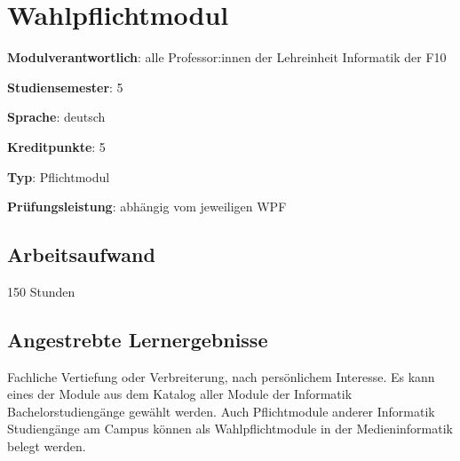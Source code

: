 \hypertarget{wahlpflichtmodulpathlabelmi-2017modulbeschreibungen-bachelorba_wpf}{%
\chapter{Wahlpflichtmodul\label{/mi-2017/modulbeschreibungen-bachelor/BA_WPF}}\label{wahlpflichtmodulpathlabelmi-2017modulbeschreibungen-bachelorba_wpf}}

\begin{modulHead}
\textbf{Modulverantwortlich}: alle Professor:innen
der Lehreinheit Informatik der
F10
\end{modulHead}
\begin{modulHead}
\textbf{Studiensemester}:
5
\end{modulHead}
\begin{modulHead}
\textbf{Sprache}:
deutsch
\end{modulHead}
\begin{modulHead}
\textbf{Kreditpunkte}:
5
\end{modulHead}
\begin{modulHead}
\textbf{Typ}:
Pflichtmodul
\end{modulHead}
\begin{modulHead}
\textbf{Prüfungsleistung}:
abhängig vom jeweiligen WPF
\end{modulHead}


\hypertarget{arbeitsaufwandpathlabelmi-2017modulbeschreibungen-bachelorba_wpf}{%
\section*{Arbeitsaufwand\label{/mi-2017/modulbeschreibungen-bachelor/BA_WPF}}\label{arbeitsaufwandpathlabelmi-2017modulbeschreibungen-bachelorba_wpf}}

150 Stunden

\hypertarget{angestrebte-lernergebnissepathlabelmi-2017modulbeschreibungen-bachelorba_wpf}{%
\section*{Angestrebte
Lernergebnisse\label{/mi-2017/modulbeschreibungen-bachelor/BA_WPF}}\label{angestrebte-lernergebnissepathlabelmi-2017modulbeschreibungen-bachelorba_wpf}}

Fachliche Vertiefung oder Verbreiterung, nach persönlichem Interesse. Es
kann eines der Module aus dem Katalog aller Module der Informatik
Bachelorstudiengänge gewählt werden. Auch Pflichtmodule anderer
Informatik Studiengänge am Campus können als Wahlpflichtmodule in der
Medieninformatik belegt werden.
